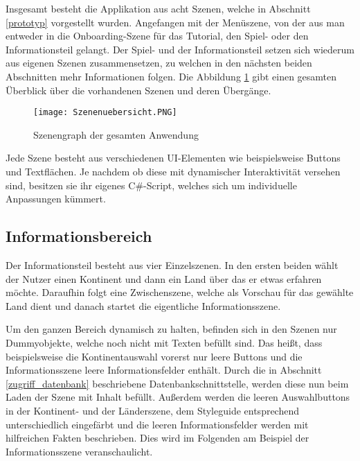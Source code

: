 Insgesamt besteht die Applikation aus acht Szenen, welche in Abschnitt \ref{prototyp} vorgestellt wurden. Angefangen mit der Menüszene, von der aus man entweder in die Onboarding-Szene für das Tutorial, den Spiel- oder den Informationsteil gelangt. 
Der Spiel- und der Informationsteil setzen sich wiederum aus eigenen Szenen zusammensetzen, zu welchen in den nächsten beiden Abschnitten mehr Informationen folgen. 
Die Abbildung \ref{fig:scenegraph} gibt einen gesamten Überblick über die vorhandenen Szenen und deren Übergänge.

\begin{figure} [h]
\centering
\texttt{[image: Szenenuebersicht.PNG]}
\caption{Szenengraph der gesamten Anwendung}
\label{fig:scenegraph}
\end{figure}

Jede Szene besteht aus verschiedenen UI-Elementen wie beispielsweise Buttons und Textflächen. Je nachdem ob diese mit dynamischer Interaktivität versehen sind, besitzen sie ihr eigenes C\#-Script, welches sich um individuelle Anpassungen kümmert.

\subsection{Informationsbereich}
Der Informationsteil besteht aus vier Einzelszenen. 
In den ersten beiden wählt der Nutzer einen Kontinent und dann ein Land über das er etwas erfahren möchte.
Daraufhin folgt eine Zwischenszene, welche als Vorschau für das gewählte Land dient und danach startet die eigentliche Informationsszene. 

Um den ganzen Bereich dynamisch zu halten, befinden sich in den Szenen nur Dummyobjekte, welche noch nicht mit Texten befüllt sind. Das heißt, dass beispielsweise die Kontinentauswahl vorerst nur leere Buttons und die Informationsszene leere Informationsfelder enthält.
Durch die in Abschnitt \ref{zugriff_datenbank} beschriebene Datenbankschnittstelle, werden diese nun beim Laden der Szene mit Inhalt befüllt. 
Außerdem werden die leeren Auswahlbuttons in der Kontinent- und der Länderszene, dem Styleguide entsprechend unterschiedlich eingefärbt und die leeren Informationsfelder werden mit hilfreichen Fakten beschrieben.
Dies wird im Folgenden am Beispiel der Informationsszene veranschaulicht.

